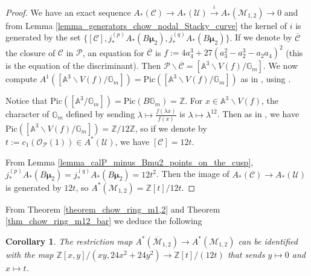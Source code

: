 \documentclass[11pt]{amsart}
\newtheorem{cor}[theorem]{Corollary}
\theoremstyle{definition}
\theoremstyle{remark}
\newcommand{\bA}{{\mathbb A}}
\newcommand{\calO}{\mathcal O}
\newcommand{\calM}{\mathcal M}
\newcommand{\calU}{\mathcal U}
\newcommand{\calC}{\mathcal C}
\newcommand{\calP}{\mathcal P}
\newcommand{\bmu}{\boldsymbol{\mu}}
\newcommand{\bG}{\mathbb{G}}
\newcommand{\Pic}{\mathrm{Pic}}
\begin{document}
\begin{proof}
We have an exact sequence $A_*(\calC)\to A_*(\calU)\xrightarrow{i} A_*(\calM_{1,2})\to 0$
and from Lemma \ref{lemma_generators_chow_nodal_Stacky_curve} the kernel of $i$ is generated by the set $\{[\calC],j^{(p)}_*A_*(B\bmu_2),j^{(q)}_*A_*(B\bmu_2)\}.$ If we denote by $\overline{\calC}$ the closure of $\calC$ in $\calP$, an equation for $\overline{\calC}$ is $f := 4a_4^3 + 27(a_3^2-a_2^3 - a_2a_4)^2$ (this is the equation of the discriminant). Then $\calP\smallsetminus \overline{\calC} = [\mathbb{A}^3 \smallsetminus V(f) / \bG_m].$
We now compute $A^1([\mathbb{A}^3 \smallsetminus V(f) / \bG_m]) = \Pic([\mathbb{A}^3 \smallsetminus V(f) / \bG_m])$ as in  \cite[Proposition 6.3]{AI19}, using \cite[Proposition 2.10]{Bri13}. 

Notice that $\Pic([\bA^3/\bG_m]) =\Pic(B\bG_m)= \mathbb{Z}$. For $x \in \mathbb{A}^3\smallsetminus V(f)$, the character of $\bG_m$ defined by sending $\lambda \mapsto \frac{f(\lambda x)}{f(x)}$ is $\lambda\mapsto \lambda^{12}$.
 Then as in \cite[Proposition 6.3]{AI19}, we have $\Pic([\mathbb{A}^3 \smallsetminus V(f) / \bG_m]) = \mathbb{Z}/12\mathbb{Z}$, so if we denote by $t:= c_1(\calO_\calP(1)) \in A^*(\calU)$, we have $[\calC] = 12t$.
 
 From Lemma \ref{lemma_calP_minus_Bmu2_points_on_the_cusp}, $j^{(p)}_*A_*(B\bmu_2) = j^{(q)}_*A_*(B\bmu_2) = 12t^2$. Then the image of $A_*(\calC)\to A_*(\calU)$ is generated by $12t$, so $A^*(\calM_{1,2}) = \mathbb{Z}[t]/12t$.
\end{proof}
From Theorem \ref{theorem_chow_ring_m1,2} and Theorem \ref{thm_chow_ring_m12_bar} we deduce the following
\begin{cor}
The restriction map $A^*(\overline{\calM}_{1,2})\to A^*(\calM_{1,2})$ can be identified with the map $\mathbb{Z}[x,y]/(xy, 24x^2 + 24y^2)\to \mathbb{Z}[t]/(12t)$ that sends $y\mapsto 0$ and $x\mapsto t$.
\end{cor}



\end{document}
